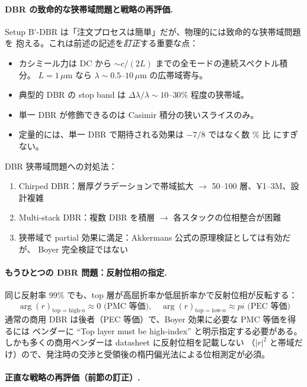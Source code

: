 \documentclass[11pt,a4paper]{article}
\def\pi{pi}%
\def\textbf#1{#1}%
\begin{document}
\paragraph{DBR の致命的な狭帯域問題と戦略の再評価.}

Setup B'-DBR は「注文プロセスは簡単」だが、\textbf{物理的には致命的な狭帯域問題}を
抱える。これは前述の記述を\emph{訂正}する重要な点：

\begin{itemize}
\item カシミール力は DC から $\sim c/(2L)$ までの全モードの連続スペクトル積分。
  $L = 1\,\mu$m なら $\lambda \sim 0.5$--$10\,\mu$m の広帯域寄与。
\item 典型的 DBR の stop band は $\Delta\lambda/\lambda \sim 10$--$30\%$ 程度の\textbf{狭帯域}。
\item 単一 DBR が修飾できるのは Casimir 積分の\textbf{狭いスライス}のみ。
\item 定量的には、単一 DBR で期待される効果は $-7/8$ ではなく\textbf{数 \% 比} にすぎない。
\end{itemize}

DBR 狭帯域問題への対処法：

\begin{enumerate}
\item \textbf{Chirped DBR}：層厚グラデーションで帯域拡大 $\to$ 50--100 層、¥1--3M、設計複雑
\item \textbf{Multi-stack DBR}：複数 DBR を積層 $\to$ 各スタックの位相整合が困難
\item \textbf{狭帯域で partial 効果に満足}：Akkermans 公式の原理検証としては有効だが、
  Boyer 完全検証ではない
\end{enumerate}

\paragraph{もうひとつの DBR 問題：反射位相の指定.}

\textbf{同じ反射率 99\% でも、top 層が高屈折率か低屈折率かで反射位相が反転する}：
\[
  \arg(r)_{\text{top = high-}n} \approx 0 \text{ (PMC 等価)},\quad
  \arg(r)_{\text{top = low-}n} \approx \pi \text{ (PEC 等価)}
\]
\textbf{通常の商用 DBR は後者（PEC 等価）}で、Boyer 効果に必要な PMC 等価を得るには
ベンダーに \textbf{``Top layer must be high-index''} と明示指定する必要がある。
しかも多くの商用ベンダーは datasheet に反射位相を記載しない
（$|r|^2$ と帯域だけ）ので、発注時の交渉と受領後の楕円偏光法による位相測定が必須。

\paragraph{正直な戦略の再評価（前節の訂正）.}
\end{document}
